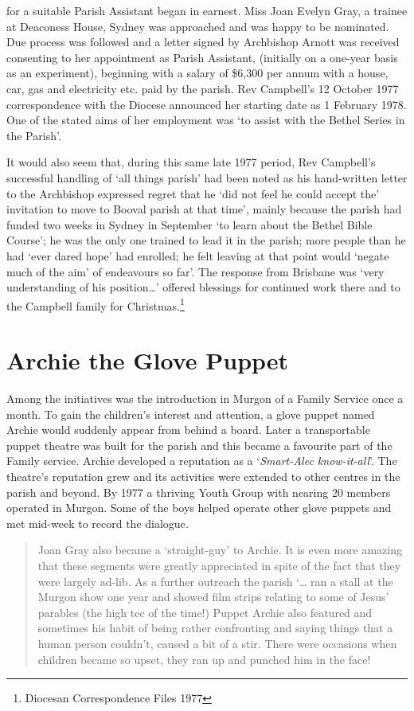 for a suitable Parish Assistant began in earnest. Miss Joan Evelyn Gray,
a trainee at Deaconess House, Sydney was approached and was happy to be
nominated. Due process was followed and a letter signed by Archbishop
Arnott was received consenting to her appointment as Parish Assistant,
(initially on a one-year basis as an experiment), beginning with a
salary of \$6,300 per annum with a house, car, gas and electricity etc.
paid by the parish. Rev Campbell's 12 October 1977 correspondence with
the Diocese announced her starting date as 1 February 1978. One of the
stated aims of her employment was `to assist with the Bethel Series in
the Parish'.

It would also seem that, during this same late 1977 period, Rev
Campbell's successful handling of `all things parish' had been noted as
his hand-written letter to the Archbishop expressed regret that he `did
not feel he could accept the' invitation to move to Booval parish at
that time', mainly because the parish had funded two weeks in Sydney in
September `to learn about the Bethel Bible Course'; he was the only one
trained to lead it in the parish; more people than he had `ever dared
hope' had enrolled; he felt leaving at that point would `negate much of
the aim' of endeavours so far'. The response from Brisbane was `very
understanding of his position\ldots' offered blessings for continued
work there and to the Campbell family for Christmas.\footnote{Diocesan
  Correspondence Files 1977}

\hypertarget{archie-the-glove-puppet}{%
\section{Archie the Glove Puppet}\label{archie-the-glove-puppet}}

Among the initiatives was the introduction in Murgon of a Family Service
once a month. To gain the children's interest and attention, a glove
puppet named Archie would suddenly appear from behind a board. Later a
transportable puppet theatre was built for the parish and this became a
favourite part of the Family service. Archie developed a reputation as a
`\emph{Smart-Alec know-it-all}'. The theatre's reputation grew and its
activities were extended to other centres in the parish and beyond. By
1977 a thriving Youth Group with nearing 20 members operated in Murgon.
Some of the boys helped operate other glove puppets and met mid-week to
record the dialogue\emph{.}

\begin{quote}
Joan Gray also became a `straight-guy' to Archie. It is even more
amazing that these segments were greatly appreciated in spite of the
fact that they were largely ad-lib. As a further outreach the parish
`\ldots{} ran a stall at the Murgon show one year and showed film strips
relating to some of Jesus' parables (the high tec of the time!) Puppet
Archie also featured and sometimes his habit of being rather confronting
and saying things that a human person couldn't, caused a bit of a stir.
There were occasions when children became so upset, they ran up and
punched him in the face!
\end{quote}


